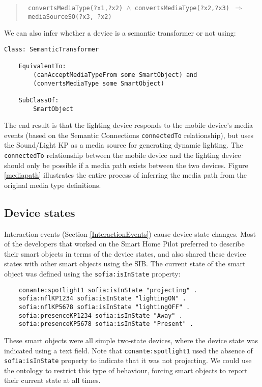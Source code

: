 \begin{quote}
\texttt{\scriptsize
convertsMediaType(?x1,?x2)~\ensuremath{\wedge}~convertsMediaType(?x2,?x3)~\ensuremath{\Rightarrow}~mediaSourceSO(?x3, ?x2)}
\end{quote}


\noindent We can also infer whether a device is a semantic transformer or not using:


\begin{verbatim}
Class: SemanticTransformer

    EquivalentTo:
        (canAcceptMediaTypeFrom some SmartObject) and
        (convertsMediaType some SmartObject)

    SubClassOf:
        SmartObject
\end{verbatim}


The end result is that the lighting device responds to the mobile device's media events (based on the Semantic Connections \texttt{connectedTo} relationship), but uses the Sound/Light KP as a media source for generating dynamic lighting. The \texttt{connectedTo} relationship between the mobile device and the lighting device should only be possible if a media path exists between the two devices. Figure \ref{mediapath} illustrates the entire process of inferring the media path from the original media type definitions.

\subsection{Device states}

Interaction events (Section \ref{InteractionEvents}) cause device state changes. Most of the developers that worked on the Smart Home Pilot preferred to describe their smart objects in terms of the device states, and also shared these device states with other smart objects using the SIB. The current state of the smart object was defined using the \texttt{sofia:isInState} property:

\begin{verbatim}
	conante:spotlight1 sofia:isInState "projecting" .
	sofia:nflKP1234 sofia:isInState "lightingON" .
	sofia:nflKP5678 sofia:isInState "lightingOFF" .
	sofia:presenceKP1234 sofia:isInState "Away" .
	sofia:presenceKP5678 sofia:isInState "Present" .
\end{verbatim}

These smart objects were all simple two-state devices, where the device state was indicated using a text field. Note that \texttt{conante:spotlight1} used the absence of \texttt{sofia:isInState} property to indicate that it was not projecting. We could use the ontology to restrict this type of behaviour, forcing smart objects to report their current state at all times.


